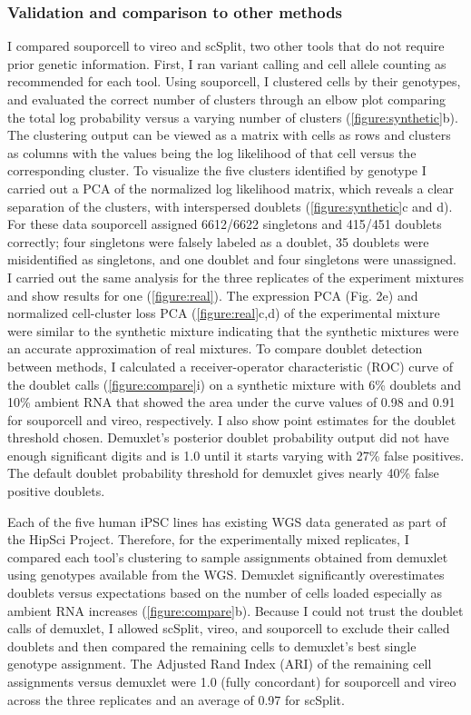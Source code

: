 \subsubsection{Validation and comparison to other methods}

\par{
I compared souporcell to vireo and scSplit, two other tools that do not require prior genetic information. First, I ran variant calling and cell allele counting as recommended for each tool. Using souporcell, I clustered cells by their genotypes, and evaluated the correct number of clusters through an elbow plot comparing the total log probability versus a varying number of clusters (\ref{figure:synthetic}b). The clustering output can be viewed as a matrix with cells as rows and clusters as columns with the values being the log likelihood of that cell versus the corresponding cluster. To visualize the five clusters identified by genotype I carried out a PCA of the normalized log likelihood matrix, which reveals a clear separation of the clusters, with interspersed doublets (\ref{figure:synthetic}c and d).  For these data souporcell assigned 6612/6622 singletons and 415/451 doublets correctly; four singletons were falsely labeled as a doublet, 35 doublets were misidentified as singletons, and one doublet and four singletons were unassigned. I carried out the same analysis for the three replicates of the  experiment mixtures and show results for one (\ref{figure:real}). The expression PCA (Fig. 2e) and normalized cell-cluster loss PCA (\ref{figure:real}c,d) of the experimental mixture were similar to the synthetic mixture indicating that the synthetic mixtures were an accurate approximation of real mixtures. To compare doublet detection between methods, I calculated a receiver-operator characteristic (ROC) curve of the doublet calls (\ref{figure:compare}i) on a synthetic mixture with 6\% doublets and 10\% ambient RNA that showed the area under the curve values of 0.98 and 0.91 for souporcell and vireo, respectively. I also show point estimates for the doublet threshold chosen. Demuxlet's posterior doublet probability output did not have enough significant digits and is 1.0 until it starts varying with 27\% false positives. The default doublet probability threshold for demuxlet gives nearly 40\% false positive doublets.
} 

\par{
Each of the five human iPSC lines has existing WGS data generated as part of the HipSci Project\cite{hipsci2}. Therefore, for the experimentally mixed replicates, I compared each tool's clustering to sample assignments obtained from demuxlet using genotypes available from the WGS. Demuxlet significantly overestimates doublets versus expectations based on the number of cells loaded\cite{10xsinglecell} especially as ambient RNA increases (\ref{figure:compare}b). Because I could not trust the doublet calls of demuxlet, I allowed scSplit, vireo, and souporcell to exclude their called doublets and then compared the remaining cells to demuxlet's best single genotype assignment. The Adjusted Rand Index (ARI) of the remaining cell assignments versus demuxlet were 1.0 (fully concordant) for souporcell and vireo across the three replicates and an average of 0.97 for scSplit.
} 

